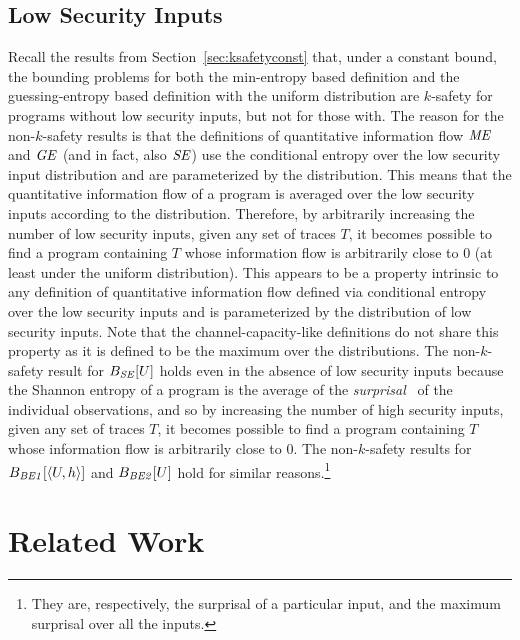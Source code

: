 \documentclass{llncs}
\newcommand{\aseq}[1]{\langle#1\rangle}
\begin{document}
\subsection{Low Security Inputs}

\label{sec:lowsecinputs}

Recall the results from Section~\ref{sec:ksafetyconst} that, under a
constant bound, the bounding problems for both the min-entropy based
definition and the guessing-entropy based definition with the uniform
distribution are $k$-safety for programs without low security inputs,
but not for those with.  The reason for the non-$k$-safety results is
that the definitions of quantitative information flow ${\it ME}$ and
${\it GE}$ (and in fact, also ${\it SE}$) use the conditional entropy
over the low security input distribution and are parameterized by the
distribution.  This means that the quantitative information flow of a
program is averaged over the low security inputs according to the
distribution.  Therefore, by arbitrarily increasing the number of low
security inputs, given any set of traces $T$, it becomes possible to
find a program containing $T$ whose information flow is arbitrarily
close to $0$ (at least under the uniform distribution).  This appears
to be a property intrinsic to any definition of quantitative
information flow defined via conditional entropy over the low security
inputs and is parameterized by the distribution of low security
inputs.  Note that the channel-capacity-like definitions do not share
this property as it is defined to be the maximum over the
distributions.  The non-$k$-safety result for $B_{\it SE}[U]$ holds
even in the absence of low security inputs because the Shannon entropy
of a program is the average of the {\em
  surprisal}~\cite{clarkson:csf2005} of the individual observations,
and so by increasing the number of high security inputs, given any set
of traces $T$, it becomes possible to find a program containing $T$
whose information flow is arbitrarily close to $0$.  The
non-$k$-safety results for $B_{\it BE1}[\aseq{U,h}]$ and $B_{\it
  BE2}[U]$ hold for similar reasons.\footnote{They are, respectively,
  the surprisal of a particular input, and the maximum surprisal over
  all the inputs.}

\section{Related Work}

\label{sec:related}
\end{document}
